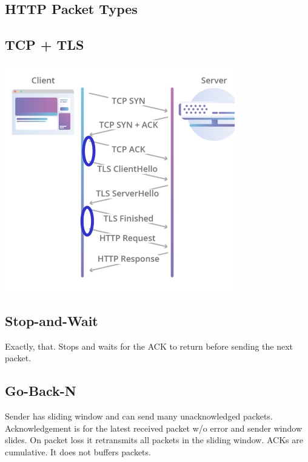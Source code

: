 \subsection{HTTP Packet Types}
\subsection{TCP + TLS}
\begin{center}
  \includegraphics[scale=0.4]{images/tcp-n-tls.png}
\end{center}
\subsection{Stop-and-Wait}
Exactly, that. Stops and waits for the ACK to return before sending the
next packet.
\subsection{Go-Back-N}
Sender has sliding window and can send many unacknowledged packets.
Acknowledgement is for the latest received packet w/o error and sender
window slides. On packet loss it retransmits all packets in the sliding
window. ACKs are cumulative. It does not buffers packets.
